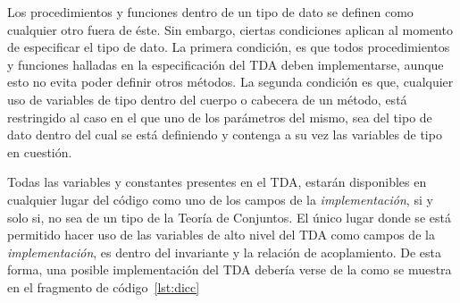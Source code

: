 Los procedimientos y funciones dentro de un tipo de dato se definen como
cualquier otro fuera de éste. Sin embargo, ciertas condiciones aplican al
momento de especificar el tipo de dato. La primera condición, es que todos
procedimientos y funciones halladas en la especificación del TDA deben
implementarse, aunque esto no evita poder definir otros métodos. La segunda
condición es que, cualquier uso de variables de tipo dentro del cuerpo o
cabecera de un método, está restringido al caso en el que uno de los
parámetros del mismo, sea del tipo de dato dentro del cual se está definiendo
y contenga a su vez las variables de tipo en cuestión.

Todas las variables y constantes presentes en el TDA, estarán disponibles en
cualquier lugar del código como uno de los campos de la
\textit{implementación}, si y solo si, no sea de un tipo de la Teoría de
Conjuntos. El único lugar donde se está permitido hacer uso de las variables
de alto nivel del TDA como campos de la \textit{implementación}, es dentro del
invariante y la relación de acoplamiento. De esta forma, una posible
implementación del TDA  debería verse de la como se muestra
en el fragmento de código~\ref{lst:dicc}


